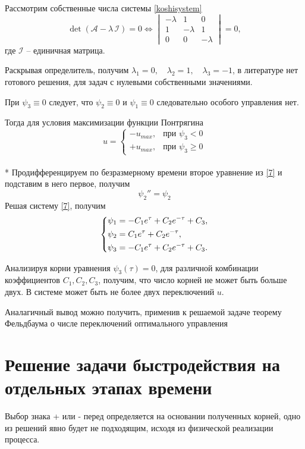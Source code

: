 \documentclass[a4paper,12pt, openany]{book}
\theoremstyle{plain} %
\theoremstyle{definition} %
\theoremstyle{remark} %
\numberwithin{equation}{chapter}
\begin{document}
{Рассмотрим собственные числа системы \eqref{koshisystem}
\begin{equation}\label{eugen_values}
    \det \left( {{\mathcal{A}} - \lambda\,\mathcal{I}} \right) = 0 \Longleftrightarrow \begin{vmatrix}
        -\lambda & 1        & 0        \\
        1        & -\lambda & 1        \\
        0        & 0        & -\lambda
    \end{vmatrix} = 0,
\end{equation}
где $\mathcal{I}$ -- единичная матрица.

Раскрывая определитель, получим $\lambda_1=0, \quad \lambda_2=1,\quad \lambda_3=-1$,
в литературе \cite{atansfalb} нет готового решения, для задач с нулевыми собственными значениями.

При $\psi_3\equiv0$ следует, что $\psi_2\equiv0$ и $\psi_1\equiv0$ следовательно особого управления нет.

Тогда для условия максимизации функции Понтрягина
\[
    u=
    \begin{cases}
        -u_{max}, & \text{при $\psi_3<0$}          \\
        +u_{max}, & \text{при $\psi_3\geqslant 0$}
    \end{cases}
\]\\*
Продифференцируем по безразмерному времени второе уравнение из \eqref{7} и подставим в него первое, получим
\[
    \psi_2 ''=\psi_2
\]
Решая систему \eqref{7}, получим
\[
    \left\{ {\begin{aligned}
                 & \psi_1 = -C_1e^\tau+C_2e^{-\tau}+C_3, \hfill  \\
                 & \psi_2 = C_1e^\tau+C_2e^{-\tau} , \hfill      \\
                 & \psi_3 = -C_1e^\tau+C_2e^{-\tau}+C_3 . \hfill \\
            \end{aligned}} \right.
\]

Анализируя корни уравнения $\psi_3(\tau)=0$, для различной комбинации
коэффициентов $C_1,C_2,C_3$, получим, что число корней не может быть больше двух. В системе может быть не более двух переключений $u$.

Аналагичный вывод можно получить, применив к решаемой задаче теорему Фельдбаума о числе переключений оптимального управления\cite{feldbaum}



\section{Решение задачи быстродействия на отдельных этапах времени}
Выбор знака + или - перед определяется на основании полученных корней,
одно из решений явно будет не подходящим, исходя из физической реализации процесса.

}
\end{document}
